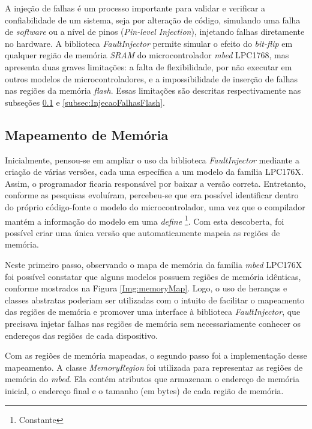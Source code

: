 A injeção de falhas é um processo importante para validar e verificar a confiabilidade de um sistema, seja por alteração de código, simulando uma falha de \textit{software} ou a nível de pinos (\textit{Pin-level Injection}), injetando falhas diretamente no hardware. A biblioteca \textit{FaultInjector} permite simular o efeito do \textit{bit-flip} em qualquer região de memória \textit{SRAM} do microcontrolador \textit{mbed} LPC1768, mas apresenta duas graves limitações: a falta de flexibilidade, por não executar em outros modelos de microcontroladores, e a impossibilidade de inserção de falhas nas regiões da memória \textit{flash}. Essas limitações são descritas respectivamente nas subseções \ref{subsec:MapDeMemoria} e \ref{subsec:InjecaoFalhasFlash}.

\subsection{Mapeamento de Memória} \label{subsec:MapDeMemoria}

Inicialmente, pensou-se em ampliar o uso da biblioteca \textit{FaultInjector} mediante a criação de várias versões, cada uma específica a um modelo da família LPC176X. Assim, o programador ficaria responsável por baixar a versão correta. Entretanto, conforme as pesquisas evoluíram, percebeu-se que era possível identificar dentro do próprio código-fonte o modelo do microcontrolador, uma vez que o compilador mantém a informação do modelo em uma \textit{define} \footnote{Constante}. Com esta descoberta, foi possível criar uma única versão que automaticamente mapeia as regiões de memória.

Neste primeiro passo, observando o mapa de memória da família \textit{mbed} LPC176X \cite{manualLpc176x:2016} foi possível constatar que alguns modelos possuem regiões de memória idênticas, conforme mostrados na Figura \ref{Img:memoryMap}. Logo, o uso de heranças e classes abstratas poderiam ser utilizadas com o intuito de facilitar o mapeamento das regiões de memória e promover uma interface à biblioteca \textit{FaultInjector}, que precisava injetar falhas nas regiões de memória sem necessariamente conhecer os endereços das regiões de cada dispositivo.

Com as regiões de memória mapeadas, o segundo passo foi a implementação desse mapeamento. A classe \textit{MemoryRegion}\cite{Kruger:2014} foi utilizada para representar as regiões de memória do \textit{mbed}. Ela contém atributos que armazenam o endereço de memória inicial, o endereço final e o tamanho (em bytes) de cada região de memória. 

